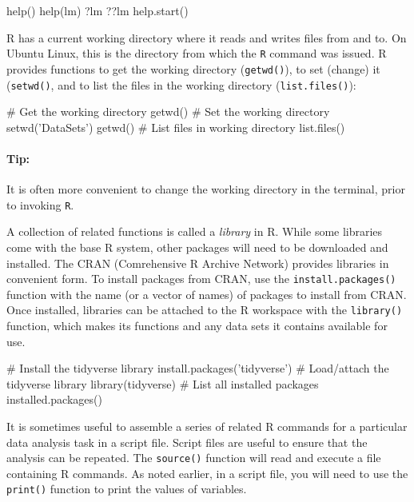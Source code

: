 \begin{samepage}
\begin{Rcode}
help()
help(lm)
?lm
??lm
help.start()
\end{Rcode}
\end{samepage}

R has a current working directory where it reads and writes files from and to. On Ubuntu Linux, this is the directory from which the \texttt{R} command was issued. R provides functions to get the working directory (\texttt{getwd()}), to set (change) it (\texttt{setwd()}, and to list the files in the working directory (\texttt{list.files()}):

\begin{samepage}
\begin{Rcode}
# Get the working directory
getwd()
# Set the working directory
setwd('DataSets')
getwd()
# List files in working directory
list.files()
\end{Rcode}
\end{samepage}

\begin{tcolorbox}[colback=code]
\paragraph*{Tip:} It is often more convenient to change the working directory in the terminal, prior to invoking \texttt{R}.
\end{tcolorbox}

A collection of related functions is called a \emph{library} in R. While some libraries come with the base R system, other packages will need to be downloaded and installed. The CRAN (Comrehensive R Archive Network) provides libraries in convenient form. To install packages from CRAN, use the \texttt{install.packages()} function with the name (or a vector of names) of packages to install from CRAN. Once installed, libraries can be attached to the R workspace with the \texttt{library()} function, which makes its functions and any data sets it contains available for use. 

\begin{samepage}
\begin{Rcode}
# Install the tidyverse library
install.packages('tidyverse')
# Load/attach the tidyverse library
library(tidyverse)
# List all installed packages
installed.packages()
\end{Rcode}
\end{samepage}

It is sometimes useful to assemble a series of related R commands for a particular data analysis task in a script file. Script files are useful to ensure that the analysis can be repeated. The \texttt{source()} function will read and execute a file containing R commands. As noted earlier, in a script file, you will need to use the \texttt{print()} function to print the values of variables.


